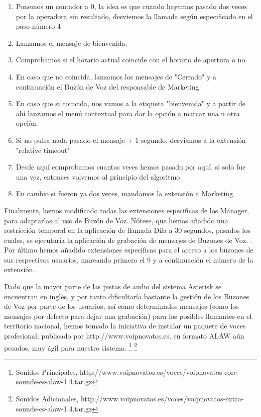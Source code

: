 \begin{enumerate}

\item Ponemos un contador a 0, la idea es que cuando hayamos pasado dos veces por la operadora sin resultado, desviemos la llamada según especificado en el paso número 4
\item Lanzamos el mensaje de bienvenida.
\item Comprobamos si el horario actual coincide con el horario de apertura o no. 
\item En caso que no coincida, lanzamos los mensajes de "Cerrado" y a continuación el Buzón de Voz del responsable de Marketing
\item En caso que si coincida, nos vamos a la etiqueta "bienvenida" y a partir de ahí lanzamos el menú contextual para dar la opción a marcar una u otra opción. 
\item Si no pulsa nada pasado el mensaje + 1 segundo, desviamos a la extensión "relative timeout" 
\item Desde aquí comprobamos cuantas veces hemos pasado por aquí, si solo fue una vez, entonces volvemos al principio del algoritmo
\item En cambio si fueron ya dos veces, mandamos la extensión a Marketing.

\end{enumerate}

Finalmente, hemos modificado todas las extensiones especificas de los Mánager, para adaptarlas al uso de Buzón de Voz. Nótese, que hemos añadido una restricción temporal en la aplicación de llamada Dila a 30 segundos, pasados los cuales, se ejecutaría la aplicación de grabación de mensajes de Buzones de Voz. . Por último hemos añadido extensiones especificas para el acceso a los buzones de sus respectivos usuarios, marcando primero el 9 y a continuación el número de la extensión.

Dado que la mayor parte de las pistas de audio del sistema Asterisk se encuentran en inglés, y por tanto dificultaría bastante la gestión de los Buzones de Voz por parte de los usuarios, así como determinados mensajes (como los mensajes por defecto para dejar una grabación) para los posibles llamantes en el territorio nacional, hemos tomado la iniciativa de instalar un paquete de voces profesional, publicado por http://www.voipnovatos.es, en formato ALAW aún pesados, muy ágil para nuestro sistema. \footnote{Sonidos Principales, http://www.voipnovatos.es/voces/voipnovatos-core-sounds-es-alaw-1.4.tar.gz} \footnote{Sonidos Adicionales, http://www.voipnovatos.es/voces/voipnovatos-extra-sounds-es-alaw-1.4.tar.gz}

